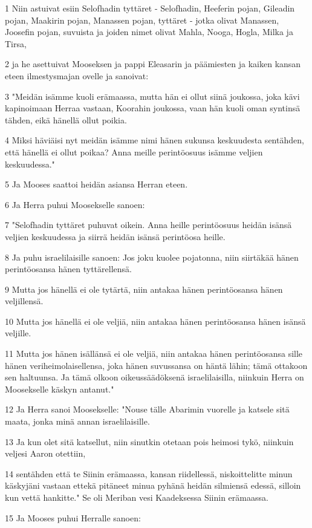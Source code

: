 \par 1 Niin astuivat esiin Selofhadin tyttäret - Selofhadin, Heeferin pojan, Gileadin pojan, Maakirin pojan, Manassen pojan, tyttäret - jotka olivat Manassen, Joosefin pojan, suvuista ja joiden nimet olivat Mahla, Nooga, Hogla, Milka ja Tirsa,
\par 2 ja he asettuivat Mooseksen ja pappi Eleasarin ja päämiesten ja kaiken kansan eteen ilmestysmajan ovelle ja sanoivat:
\par 3 "Meidän isämme kuoli erämaassa, mutta hän ei ollut siinä joukossa, joka kävi kapinoimaan Herraa vastaan, Koorahin joukossa, vaan hän kuoli oman syntinsä tähden, eikä hänellä ollut poikia.
\par 4 Miksi häviäisi nyt meidän isämme nimi hänen sukunsa keskuudesta sentähden, että hänellä ei ollut poikaa? Anna meille perintöosuus isämme veljien keskuudessa."
\par 5 Ja Mooses saattoi heidän asiansa Herran eteen.
\par 6 Ja Herra puhui Moosekselle sanoen:
\par 7 "Selofhadin tyttäret puhuvat oikein. Anna heille perintöosuus heidän isänsä veljien keskuudessa ja siirrä heidän isänsä perintöosa heille.
\par 8 Ja puhu israelilaisille sanoen: Jos joku kuolee pojatonna, niin siirtäkää hänen perintöosansa hänen tyttärellensä.
\par 9 Mutta jos hänellä ei ole tytärtä, niin antakaa hänen perintöosansa hänen veljillensä.
\par 10 Mutta jos hänellä ei ole veljiä, niin antakaa hänen perintöosansa hänen isänsä veljille.
\par 11 Mutta jos hänen isällänsä ei ole veljiä, niin antakaa hänen perintöosansa sille hänen veriheimolaisellensa, joka hänen suvussansa on häntä lähin; tämä ottakoon sen haltuunsa. Ja tämä olkoon oikeussäädöksenä israelilaisilla, niinkuin Herra on Moosekselle käskyn antanut."
\par 12 Ja Herra sanoi Moosekselle: "Nouse tälle Abarimin vuorelle ja katsele sitä maata, jonka minä annan israelilaisille.
\par 13 Ja kun olet sitä katsellut, niin sinutkin otetaan pois heimosi tykö, niinkuin veljesi Aaron otettiin,
\par 14 sentähden että te Siinin erämaassa, kansan riidellessä, niskoittelitte minun käskyjäni vastaan ettekä pitäneet minua pyhänä heidän silmiensä edessä, silloin kun vettä hankitte." Se oli Meriban vesi Kaadeksessa Siinin erämaassa.
\par 15 Ja Mooses puhui Herralle sanoen:
